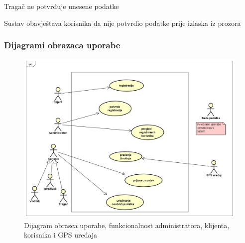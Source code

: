 \begin{packed_item}
\begin{packed_item}
\begin{packed_enum}
						\end{packed_enum}
						
						\item[3.a] Tragač ne potvrđuje unesene podatke
						\item[] \begin{packed_enum}
							
							\item Sustav obavještava korisnika da nije potvrdio podatke prije izlaska iz prozora
							
						\end{packed_enum}
						
					\end{packed_item}
					
				\end{packed_item}
					
					
					
				\subsubsection{Dijagrami obrazaca uporabe}
						
				
				\begin{figure}[H]
					\includegraphics[scale=0.5]{slike/dijagram1.PNG} %
					\centering
					\caption{Dijagram obrasca uporabe, funkcionalnost administratora, klijenta, korisnika i GPS uređaja}
					\label{fig:dijagram1} %
				\end{figure}
				
